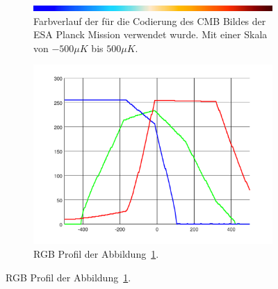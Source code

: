 \begin{figure}
	\centering
	\begin{subfigure}
		\centering
		\includegraphics[width=0.9\linewidth]{cmb/images/color-strip-full.png}
		\caption{Farbverlauf der für die Codierung des CMB Bildes der ESA 
		Planck 
			Mission verwendet wurde. Mit einer Skala von $-500\mu K$ bis 
			$500\mu 
			K$.}
		\label{fig:color-strip-orig}
	\end{subfigure}
	\hfill
	\begin{subfigure}
		\centering
		\includegraphics[width=\linewidth]{cmb/converter/rgb-graph.pdf}
		\caption{RGB Profil der Abbildung~\ref{fig:color-strip-orig}.}
		\label{fig:color-strip-orig-rgb}
	\end{subfigure}
\end{figure}

